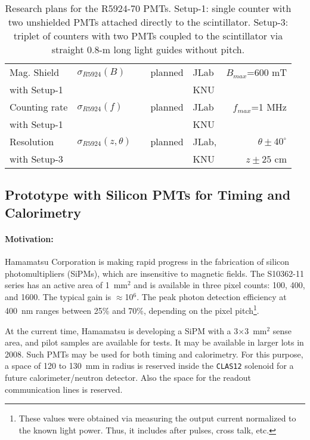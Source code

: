 \documentclass[12pt]{article}
\begin{document}
\begin{table}[htbp]
\begin{center}
\begin{tabular}{|l|l|c|l|l|r|}
Mag. Shield                 & $\sigma_{R5924}(B)$ &      & planned  & JLab          & $B_{max}$=600 mT     \\
with Setup-1                &                &           &          & KNU           &                      \\ \hline
Counting rate               & $\sigma_{R5924}(f)$ &      & planned  & JLab          & $f_{max}$=1 MHz      \\
with Setup-1                &                &           &          & KNU           &                      \\ \hline
Resolution                  & $\sigma_{R5924}(z,\theta)$ & & planned & JLab,        & $\theta\pm40^\circ$  \\
with Setup-3                &                &           &          & KNU           & $z\pm25$ cm          \\ \hline
\end{tabular}
\end{center}
\caption{Research plans for the R5924-70 PMTs.  Setup-1: single counter with 
two unshielded PMTs attached directly to the scintillator. Setup-3: triplet 
of counters with two PMTs coupled to the scintillator via straight 0.8-m long 
light guides without pitch.}
\label{Table4}
\end{table}

\subsection{Prototype with Silicon PMTs for Timing and Calorimetry}

\paragraph{Motivation:} 
Hamamatsu Corporation is making rapid progress in the fabrication of silicon 
photomultipliers (SiPMs), which are insensitive to magnetic fields.  The 
S10362-11 series has an active area of 1~mm$^2$ and is available in three 
pixel counts: 100, 400, and 1600.  The typical gain is $\approx$10$^6$.  The 
peak photon detection efficiency at 400~nm ranges between 25\% and 70\%, 
depending on the pixel pitch\footnote{These values were obtained via 
measuring the output current normalized to the known light power. Thus, it 
includes after pulses, cross talk, etc.}. 
  
At the current time, Hamamatsu is developing a SiPM with a 3$\times$3~mm$^2$ 
sense area, and pilot samples are available for tests.  It may be available 
in larger lots in 2008.  Such PMTs may be used for both timing and 
calorimetry.  For this purpose, a space of 120 to 130~mm in radius is 
reserved inside the {\tt CLAS12} solenoid for a future calorimeter/neutron
detector.  Also the space for the readout communication lines is reserved.  
  
\end{document}
